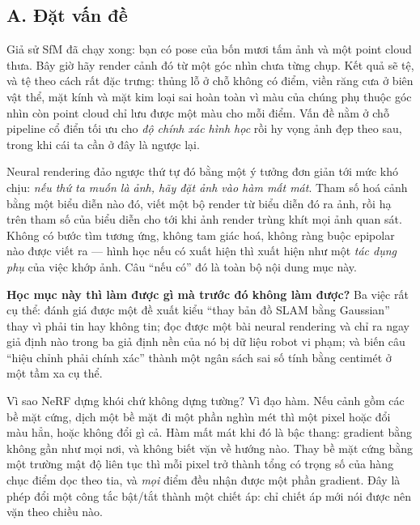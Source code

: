 \documentclass[../../../deep_learning.tex]{subfiles}
\begin{document}
\subsection{A. Đặt vấn đề}
Giả sử SfM đã chạy xong: bạn có pose của bốn mươi tấm ảnh và một point cloud thưa. Bây giờ hãy render cảnh đó từ một góc nhìn chưa từng chụp. Kết quả sẽ tệ, và tệ theo cách rất đặc trưng: thủng lỗ ở chỗ không có điểm, viền răng cưa ở biên vật thể, mặt kính và mặt kim loại sai hoàn toàn vì màu của chúng phụ thuộc góc nhìn còn point cloud chỉ lưu được một màu cho mỗi điểm. Vấn đề nằm ở chỗ pipeline cổ điển tối ưu cho \emph{độ chính xác hình học} rồi hy vọng ảnh đẹp theo sau, trong khi cái ta cần ở đây là ngược lại.

Neural rendering đảo ngược thứ tự đó bằng một ý tưởng đơn giản tới mức khó chịu: \emph{nếu thứ ta muốn là ảnh, hãy đặt ảnh vào hàm mất mát}. Tham số hoá cảnh bằng một biểu diễn nào đó, viết một bộ render  từ biểu diễn đó ra ảnh, rồi hạ  trên tham số của biểu diễn cho tới khi ảnh render trùng khít mọi ảnh quan sát. Không có bước tìm tương ứng, không tam giác hoá, không ràng buộc epipolar nào được viết ra --- hình học nếu có xuất hiện thì xuất hiện như một \emph{tác dụng phụ} của việc khớp ảnh. Câu ``nếu có'' đó là toàn bộ nội dung mục này.

\textbf{Học mục này thì làm được gì mà trước đó không làm được?} Ba việc rất cụ thể: đánh giá được một đề xuất kiểu ``thay bản đồ SLAM bằng Gaussian'' thay vì phải tin hay không tin; đọc được một bài neural rendering và chỉ ra ngay giả định nào trong ba giả định nền của nó bị dữ liệu robot vi phạm; và biến câu ``hiệu chỉnh phải chính xác'' thành một ngân sách sai số tính bằng centimét ở một tầm xa cụ thể.

\begin{trucgiac}
Vì sao NeRF dựng khói chứ không dựng tường? Vì đạo hàm. Nếu cảnh gồm các bề mặt cứng, dịch một bề mặt đi một phần nghìn mét thì một pixel hoặc đổi màu hẳn, hoặc không đổi gì cả. Hàm mất mát khi đó là bậc thang: gradient bằng không gần như mọi nơi, và  không biết vặn về hướng nào. Thay bề mặt cứng bằng một trường mật độ liên tục thì mỗi pixel trở thành tổng có trọng số của hàng chục điểm dọc theo tia, và \emph{mọi} điểm đều nhận được một phần gradient. Đây là phép đổi một công tắc bật/tắt thành một chiết áp: chỉ chiết áp mới nói được nên vặn theo chiều nào.
\end{trucgiac}
\end{document}
